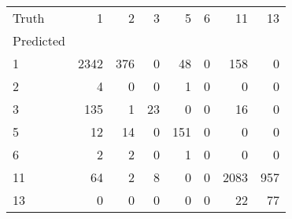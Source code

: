 \begin{tabular}{lrrrrrrr}
\toprule
Truth & 1 & 2 & 3 & 5 & 6 & 11 & 13 \\
Predicted &  &  &  &  &  &  &  \\
\midrule
1 & 2342 & 376 & 0 & 48 & 0 & 158 & 0 \\
2 & 4 & 0 & 0 & 1 & 0 & 0 & 0 \\
3 & 135 & 1 & 23 & 0 & 0 & 16 & 0 \\
5 & 12 & 14 & 0 & 151 & 0 & 0 & 0 \\
6 & 2 & 2 & 0 & 1 & 0 & 0 & 0 \\
11 & 64 & 2 & 8 & 0 & 0 & 2083 & 957 \\
13 & 0 & 0 & 0 & 0 & 0 & 22 & 77 \\
\bottomrule
\end{tabular}
